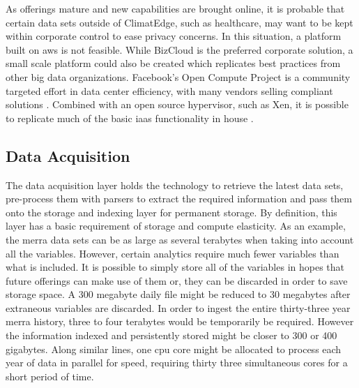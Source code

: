 As offerings mature and new capabilities are brought online, it is probable that certain data sets outside of ClimatEdge\texttrademark{}, such as healthcare, may want to be kept within corporate control to ease privacy concerns. In this situation, a platform built on \gls{aws} is not feasible. While BizCloud is the preferred corporate solution, a small scale platform could also be created which replicates best practices from other big data organizations. Facebook's Open Compute Project is a community targeted effort in data center efficiency, with many vendors selling compliant solutions \cite{opencompute}. Combined with an open source hypervisor, such as Xen, it is possible to replicate much of the basic \gls{iaas} functionality in house \cite{xen}.
\subsection{Data Acquisition}
The data acquisition layer holds the technology to retrieve the latest data sets, pre-process them with parsers  to extract the required information and pass them onto the storage and indexing layer for permanent storage. By definition, this layer has a basic requirement of storage and compute elasticity. As an example, the \gls{merra} data sets can be as large as several terabytes when taking into account all the variables. However, certain analytics require much fewer variables than what is included. It is possible to simply store all of the variables in hopes that future offerings can make use of them or, they can be discarded in order to save storage space. A 300 megabyte daily file might be reduced to 30 megabytes after extraneous variables are discarded.  In order to ingest the entire thirty-three year \gls{merra} history, three to four terabytes would be temporarily be required. However the information indexed and persistently stored might be closer to 300 or 400 gigabytes. Along similar lines, one \gls{cpu} core might be allocated to process each year of data in parallel for speed, requiring thirty three simultaneous cores for a short period of time. \\

